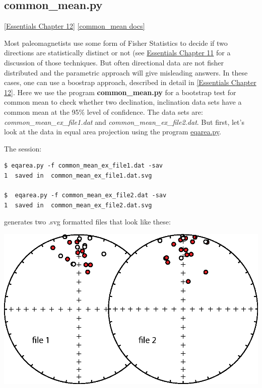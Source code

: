 \documentclass[11pt]{book}
\begin{document}
{{


\subsection{common\_mean.py}
\href{http://earthref.org/MAGIC/books/Tauxe/Essentials/WebBook3ch12.html#ch12}{[Essentials Chapter 12]}
\href{https://github.com/PmagPy/PmagPy/blob/master/programs/common_mean.py}{[common\_mean docs]}

Most paleomagnetists use some form of Fisher Statistics to decide if two directions are statistically distinct or not (see \href{http://earthref.org/MAGIC/books/Tauxe/Essentials/WebBook3ch11.html#ch11}{Essentials Chapter 11} for a discussion of those techniques.  But often directional data are not fisher distributed and the parametric approach will give misleading answers.  In these cases, one can use a boostrap approach, described in detail in \href{http://earthref.org/MAGIC/books/Tauxe/Essentials/WebBook3ch12.html#ch12}{[Essentials Chapter 12]}.  Here we
use the program {\bf common\_mean.py} for a bootstrap test for common mean to check whether two declination, inclination data sets have a common mean at the 95\% level of confidence.    The data sets are: {\it common\_mean\_ex\_file1.dat } and {\it common\_mean\_ex\_file2.dat}.  But first, let's look at the data in equal area projection  using the program \href{#eqarea.py}{eqarea.py}.

The session:
\begin{verbatim}
$ eqarea.py -f common_mean_ex_file1.dat -sav
1  saved in  common_mean_ex_file1.dat.svg

$  eqarea.py -f common_mean_ex_file2.dat -sav
1  saved in  common_mean_ex_file2.dat.svg
\end{verbatim}

\noindent generates two .svg formatted files that look like these:


  \includegraphics[width=15cm]{EPSfiles/common-mean-eq.eps}

}}
\end{document}
